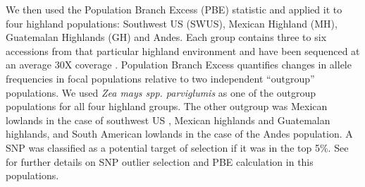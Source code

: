 \documentclass[9pt,twocolumn,twoside,lineno]{gsajnl}
\begin{document}
We then used the Population Branch Excess (PBE) statistic \citep{Pool2017-oa} and applied it to four highland populations: Southwest US (SWUS), Mexican Highland (MH), Guatemalan Highlands (GH) and Andes. 
Each group contains three to six accessions from that particular highland environment and have been sequenced at an average 30X coverage \citep{Wang2017-bc, Wang2020-mp}. Population Branch Excess quantifies changes in allele frequencies in focal populations relative to two independent “outgroup” populations. 
We used \textit{Zea mays spp. parviglumis} as one of the outgroup populations for all four highland groups.  
The other outgroup was  Mexican lowlands  in the case of southwest US , Mexican highlands and Guatemalan highlands, and South American lowlands in the case of the Andes population. 
A SNP was classified as a potential target of selection if it was in the top 5\%. See \cite{Wang2020-mp} for further details on SNP outlier selection and PBE calculation in this populations. 
\end{document}
